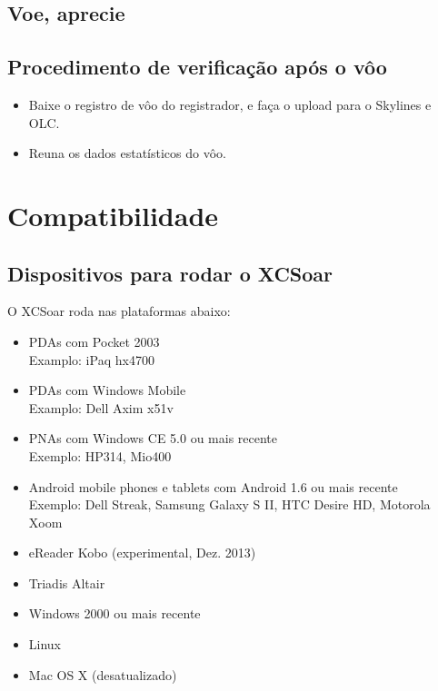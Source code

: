 \subsection*{Voe, aprecie}
\vspace{4em}

\subsection*{Procedimento de verificação após o vôo}
\begin{itemize}
\item Baixe o registro de vôo do registrador, e faça o upload para o Skylines e OLC.
\item Reuna os dados estatísticos do vôo.
\end{itemize}
\newpage




\section{Compatibilidade}

\subsection*{Dispositivos para rodar o XCSoar}

O XCSoar roda nas plataformas abaixo:

\begin{itemize}
\item PDAs com Pocket 2003 \\
  Examplo: iPaq hx4700
\item PDAs com Windows Mobile \\
  Examplo: Dell Axim x51v
\item PNAs com Windows CE 5.0 ou mais recente \\
  Exemplo: HP314, Mio400
  \item Android mobile phones e tablets com Android 1.6 ou mais recente \\
  Exemplo: Dell Streak, Samsung Galaxy S II, HTC Desire HD,
  Motorola Xoom
\item eReader Kobo (experimental, Dez. 2013)
\item Triadis Altair
\item Windows 2000 ou mais recente
\item Linux
\item Mac OS X (desatualizado)
\end{itemize}

